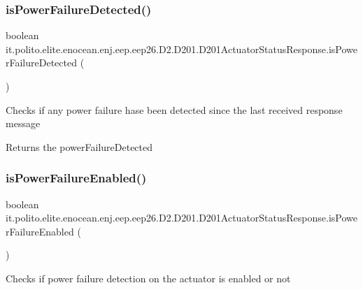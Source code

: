 \subsubsection{\texorpdfstring{is\+Power\+Failure\+Detected()}{isPowerFailureDetected()}}
{\footnotesize\ttfamily boolean it.\+polito.\+elite.\+enocean.\+enj.\+eep.\+eep26.\+D2.\+D201.\+D201\+Actuator\+Status\+Response.\+is\+Power\+Failure\+Detected (\begin{DoxyParamCaption}{ }\end{DoxyParamCaption})}

Checks if any power failure hase been detected since the last received response message

\begin{DoxyReturn}{Returns}
the power\+Failure\+Detected 
\end{DoxyReturn}
\hypertarget{classit_1_1polito_1_1elite_1_1enocean_1_1enj_1_1eep_1_1eep26_1_1_d2_1_1_d201_1_1_d201_actuator_status_response_a8435410dbffddbc9f0c258fb08571ba3}{}\label{classit_1_1polito_1_1elite_1_1enocean_1_1enj_1_1eep_1_1eep26_1_1_d2_1_1_d201_1_1_d201_actuator_status_response_a8435410dbffddbc9f0c258fb08571ba3} 
\subsubsection{\texorpdfstring{is\+Power\+Failure\+Enabled()}{isPowerFailureEnabled()}}
{\footnotesize\ttfamily boolean it.\+polito.\+elite.\+enocean.\+enj.\+eep.\+eep26.\+D2.\+D201.\+D201\+Actuator\+Status\+Response.\+is\+Power\+Failure\+Enabled (\begin{DoxyParamCaption}{ }\end{DoxyParamCaption})}

Checks if power failure detection on the actuator is enabled or not

